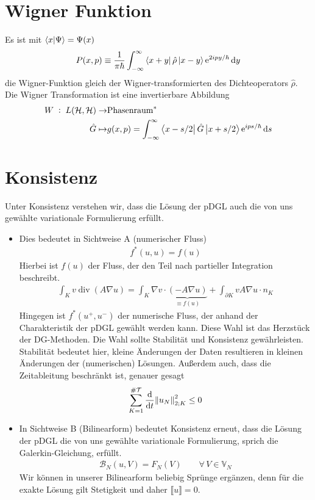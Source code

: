 \section{Wigner Funktion}
\label{sec:wignerfunktion}
Es ist mit $\bra{x}\ket{\Psi} = \Psi(x)$
\begin{equation}
  P(x,p) \equiv \frac{1}{\pi\hbar} \int_{-\infty}^{\infty} \bra{x+y}\hat{\rho} \ket{x-y} \text{e}^{2ipy/\hbar} \mathop{}\!\mathrm{d} y
\end{equation}
die Wigner-Funktion gleich der Wigner-transformierten des Dichteoperators $\hat{\rho}$. Die Wigner Transformation ist eine invertierbare Abbildung
\begin{align}
  W\; :\; L(\mathcal{H},\mathcal{H})  \rightarrow & \text{Phasenraum}^* \\
   \hat{G} \mapsto & g(x,p) = \int_{-\infty}^{\infty} \bra{x-s/2}\hat{G} \ket{x+s/2} \text{e}^{ips/\hbar} \mathop{}\!\mathrm{d} s
\end{align}

\section{Konsistenz}
Unter Konsistenz verstehen wir, dass die Lösung der pDGL auch die von uns gewählte variationale Formulierung erfüllt.
\begin{itemize}
  \item
Dies bedeutet in Sichtweise A (numerischer Fluss)
\begin{align}
  f^*(u,u) = f(u)
\end{align}
Hierbei ist $f(u)$ der Fluss, der den Teil nach partieller Integration beschreibt.
\begin{align}
  \int_{K} v\operatorname{div}(A\nabla u) = \int_K \nabla v \cdot \underbrace{(-A\nabla u)}_{\equiv f(u)} + \int_{\partial K} v A\nabla u \cdot n_K
\end{align}
Hingegen ist $f^*(u^+,u^-)$ der numerische Fluss, der anhand der Charakteristik der pDGL gewählt werden kann. Diese Wahl ist das Herzstück der DG-Methoden. Die Wahl sollte Stabilität und Konsistenz gewährleisten. Stabilität bedeutet hier, kleine Änderungen der Daten resultieren in kleinen Änderungen der (numerischen) Lösungen. Außerdem auch, dass die Zeitableitung beschränkt ist, genauer gesagt
\begin{align}
  \sum_{K=1}^{\#\mathcal{T}}\frac{\mathrm{d}}{\mathrm{d}t}\norm{u_N}^2_{2;K} \leq 0
\end{align}
\item
In Sichtweise B (Bilinearform) bedeutet Konsistenz erneut, dass die Lösung der pDGL die von uns gewählte variationale Formulierung, sprich die Galerkin-Gleichung, erfüllt.
\begin{align}
  \mathcal{B}_N(u,V) = F_N(V) \qquad \forall \, {V\in\mathbb{V}_N}
\end{align}
Wir können in unserer Bilinearform beliebig Sprünge ergänzen, denn für die exakte Lösung gilt Stetigkeit und daher $\llbracket u \rrbracket = 0$.
\end{itemize}


